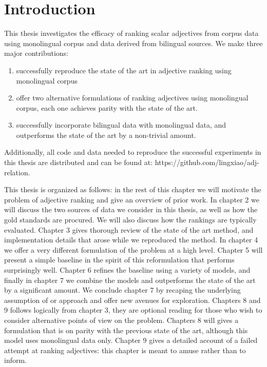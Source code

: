 \section{Introduction}

This thesis investigates the efficacy of ranking scalar adjectives from corpus data using monolingual corpus and data derived from bilingual sources. We make three major contributions:

\begin{enumerate}
	\item successfully reproduce the state of the art in adjective ranking using monolingual corpus
	\item offer two alternative formulations of ranking adjectives using monolingual corpus, each one achieves parity with the state of the art. 
	\item successfully incorporate bilingual data with monolingual data, and outperforms the state of the art by a non-trivial amount.
\end{enumerate}

Additionally, all code and data needed to reproduce the successful experiments in this thesis are distributed and can be found at: https://github.com/lingxiao/adj-relation. 

This thesis is organized as follows: in the rest of this chapter we will motivate the problem of adjective ranking and give an overview of prior work. In chapter 2 we will discuss the two sources of data we consider in this thesis, as well as how the gold standards are procured. We will also discuss how the rankings are typically evaluated. Chapter 3 gives thorough review of the state of the art method, and implementation details that arose while we reproduced the method. In chapter 4 we offer a very different formulation of the problem at a high level. Chapter 5 will present a simple baseline in the spirit of this reformulation that performs surprisingly well. Chapter 6 refines the baseline using a variety of models, and finally in chapter 7 we combine the models and outperforms the state of the art by a significant amount. We conclude chapter 7 by recaping the underlying assumption of or approach and offer new avenues for exploration. Chapters 8 and 9 follows logically from chapter 3, they are optional reading for those who wish to consider alternative points of view on the problem. Chapters 8 will gives a formulation that is on parity with the previous state of the art, although this model uses monolingual data only. Chapter 9 gives a detailed account of a failed attempt at ranking adjectives: this chapter is meant to amuse rather than to inform.

